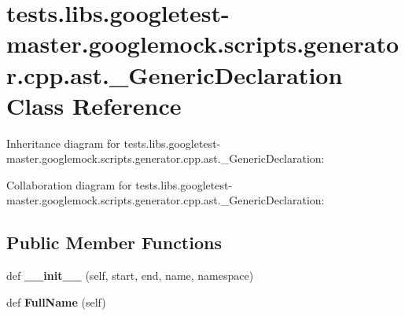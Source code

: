 \hypertarget{classtests_1_1libs_1_1googletest-master_1_1googlemock_1_1scripts_1_1generator_1_1cpp_1_1ast_1_1__GenericDeclaration}{}\section{tests.\+libs.\+googletest-\/master.googlemock.\+scripts.\+generator.\+cpp.\+ast.\+\_\+\+Generic\+Declaration Class Reference}
\label{classtests_1_1libs_1_1googletest-master_1_1googlemock_1_1scripts_1_1generator_1_1cpp_1_1ast_1_1__GenericDeclaration}


Inheritance diagram for tests.\+libs.\+googletest-\/master.googlemock.\+scripts.\+generator.\+cpp.\+ast.\+\_\+\+Generic\+Declaration\+:


Collaboration diagram for tests.\+libs.\+googletest-\/master.googlemock.\+scripts.\+generator.\+cpp.\+ast.\+\_\+\+Generic\+Declaration\+:
\subsection*{Public Member Functions}
\begin{DoxyCompactItemize}
\item 
\mbox{\label{classtests_1_1libs_1_1googletest-master_1_1googlemock_1_1scripts_1_1generator_1_1cpp_1_1ast_1_1__GenericDeclaration_a72e2e8397c7591503d58443fd7baa1cc}} 
def {\bfseries \+\_\+\+\_\+init\+\_\+\+\_\+} (self, start, end, name, namespace)
\item 
\mbox{\label{classtests_1_1libs_1_1googletest-master_1_1googlemock_1_1scripts_1_1generator_1_1cpp_1_1ast_1_1__GenericDeclaration_a9cfc1bdbcd4e334c232f847e9245a8eb}} 
def {\bfseries Full\+Name} (self)
\end{DoxyCompactItemize}
